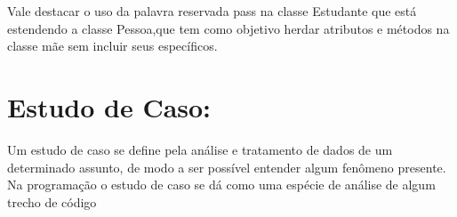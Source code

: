 Vale destacar o uso da palavra reservada pass na classe Estudante que está estendendo a classe Pessoa,que tem como objetivo herdar atributos e métodos na classe mãe sem incluir seus específicos. 
    \section{Estudo de Caso: }
Um estudo de caso se define pela análise e tratamento de dados de um determinado assunto, de modo a ser possível entender algum fenômeno presente. Na programação o estudo de caso se dá como uma espécie de análise de algum trecho de código 